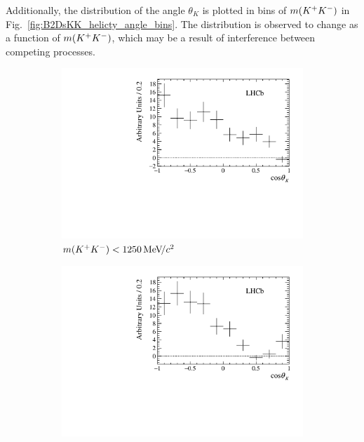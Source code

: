 Additionally, the distribution of the angle $\theta_{K}$ is plotted in bins of $m({{K}^+}{{K}^-})$ in Fig.~\ref{fig:B2DsKK_helicty_angle_bins}.
The distribution is observed to change as a function of $m({{K}^+}{{K}^-})$, which may be a result of interference between competing processes.

\begin{figure}[!h]
    \centering
    \begin{subfigure}[t]{0.49\textwidth}
        \includegraphics[width=1.0\textwidth]{figs/B2DsKK/helAngle_bin1_sweighted.pdf}
        \caption{$m({{K}^+}{{K}^-})<1250{\mathrm{\,Me\kern -0.1em V\!/}c^2}$}
    \end{subfigure}
    \begin{subfigure}[t]{0.49\textwidth}
        \includegraphics[width=1.0\textwidth]{figs/B2DsKK/helAngle_bin2_sweighted.pdf}

\end{subfigure}
\end{figure}
